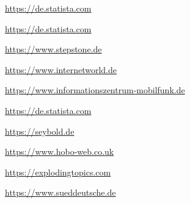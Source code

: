 %

\begin{thebibliography}{9}
\href{https://de.statista.com/statistik/daten/studie/805920/umfrage/anzahl-der-internetnutzer-weltweit/}{https://de.statista.com}

\href{https://de.statista.com/statistik/daten/studie/1388/umfrage/taegliche-nutzung-des-internets-in-minuten/}{https://de.statista.com}

\href{https://www.stepstone.de/e-recruiting/blog/jobstudie-wie-ticken-die-generationen/}{https://www.stepstone.de}

\href{https://www.internetworld.de/plattformen/amazon/80-prozent-deutschen-kaufen-amazon-2206946.html}{https://www.internetworld.de}

\href{https://www.informationszentrum-mobilfunk.de/artikel/zahlen-und-fakten-zur-social-media-nutzung}{https://www.informationszentrum-mobilfunk.de}

\href{https://de.statista.com/statistik/daten/studie/198959/umfrage/anzahl-der-smartphonenutzer-in-deutschland-seit-2010/}{https://de.statista.com}

\href{https://seybold.de/11-google-fakten/}{https://seybold.de}

\href{https://www.hobo-web.co.uk/your-website-design-should-load-in-4-seconds/}{https://www.hobo-web.co.uk}

\href{https://explodingtopics.com/blog/mobile-internet-traffic}{https://explodingtopics.com}

\href{https://www.sueddeutsche.de/panorama/karneval-bonbon-karamelle-design-fasching-1.5748710}{https://www.sueddeutsche.de}

\end{thebibliography}
